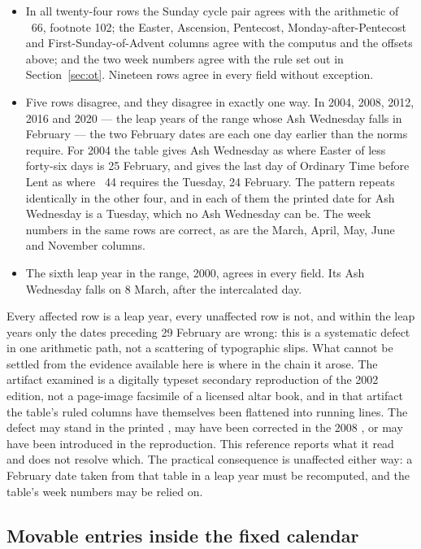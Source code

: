 \begin{itemize}
\item In all twenty-four rows the Sunday cycle pair agrees with the arithmetic of ~66,
footnote 102; the Easter, Ascension, Pentecost, Monday-after-Pentecost and First-Sunday-of-Advent
columns agree with the computus and the offsets above; and the two week numbers agree with the rule
set out in Section~\ref{sec:ot}. Nineteen rows agree in every field without exception.
\item Five rows disagree, and they disagree in exactly one way. In 2004, 2008, 2012, 2016 and 2020
--- the leap years of the range whose Ash Wednesday falls in February --- the two February dates are
each one day earlier than the norms require. For 2004 the table gives Ash Wednesday as  where Easter of  less forty-six days is 25 February, and gives the last day of
Ordinary Time before Lent as  where ~44 requires the Tuesday, 24
February. The pattern repeats identically in the other four, and in each of them the printed date
for Ash Wednesday is a Tuesday, which no Ash Wednesday can be. The week numbers in the same rows are
correct, as are the March, April, May, June and November columns.
\item The sixth leap year in the range, 2000, agrees in every field. Its Ash Wednesday falls on 8
March, after the intercalated day.
\end{itemize}

Every affected row is a leap year, every unaffected row is not, and within the leap years only the
dates preceding 29 February are wrong: this is a systematic defect in one arithmetic path, not a
scattering of typographic slips. What cannot be settled from the evidence available here is where in
the chain it arose. The
artifact examined is a digitally typeset secondary reproduction of the 2002 edition, not a page-image
facsimile of a licensed altar book, and in that artifact the table's ruled columns have themselves
been flattened into running lines. The defect may stand in the printed , may
have been corrected in the 2008 , or may have been introduced in the
reproduction. This reference reports what it read and does not resolve which. The practical
consequence is unaffected either way: a February date taken from that table in a leap year must be
recomputed, and the table's week numbers may be relied on.

\subsection{Movable entries inside the fixed calendar}

